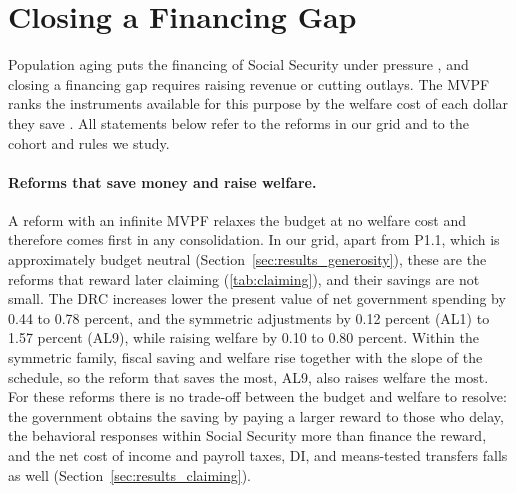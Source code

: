\section{Closing a Financing Gap}\label{sec:financing}

Population aging puts the financing of Social Security under pressure \citep{trustees2024,cbo2024socialsecurity}, and closing a financing gap requires raising revenue or cutting outlays. The MVPF ranks the instruments available for this purpose by the welfare cost of each dollar they save \citep{hendren2016policy,hendren2020unified}. All statements below refer to the reforms in our grid and to the cohort and rules we study.

\paragraph{Reforms that save money and raise welfare.} A reform with an infinite MVPF relaxes the budget at no welfare cost and therefore comes first in any consolidation. In our grid, apart from P1.1, which is approximately budget neutral (Section~\ref{sec:results_generosity}), these are the reforms that reward later claiming (\autoref{tab:claiming}), and their savings are not small. The DRC increases lower the present value of net government spending by 0.44 to 0.78 percent, and the symmetric adjustments by 0.12 percent (AL1) to 1.57 percent (AL9), while raising welfare by 0.10 to 0.80 percent. Within the symmetric family, fiscal saving and welfare rise together with the slope of the schedule, so the reform that saves the most, AL9, also raises welfare the most. For these reforms there is no trade-off between the budget and welfare to resolve: the government obtains the saving by paying a larger reward to those who delay, the behavioral responses within Social Security more than finance the reward, and the net cost of income and payroll taxes, DI, and means-tested transfers falls as well (Section~\ref{sec:results_claiming}).

